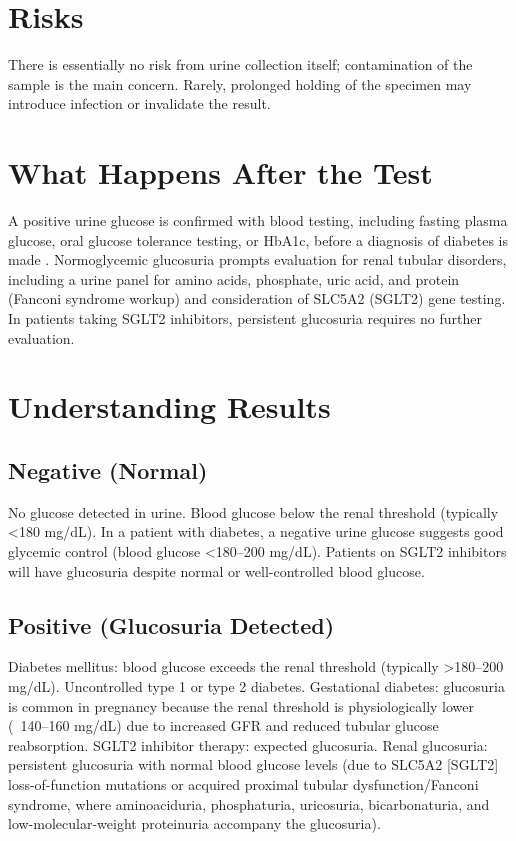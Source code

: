 \section*{Risks}
There is essentially no risk from urine collection itself; contamination of the sample is the main concern. Rarely, prolonged holding of the specimen may introduce infection or invalidate the result.
\section*{What Happens After the Test}
A positive urine glucose is confirmed with blood testing, including fasting plasma glucose, oral glucose tolerance testing, or HbA1c, before a diagnosis of diabetes is made \cite{ada2024standards}. Normoglycemic glucosuria prompts evaluation for renal tubular disorders, including a urine panel for amino acids, phosphate, uric acid, and protein (Fanconi syndrome workup) and consideration of SLC5A2 (SGLT2) gene testing. In patients taking SGLT2 inhibitors, persistent glucosuria requires no further evaluation.
\section*{Understanding Results}
\subsection*{Negative (Normal)}
No glucose detected in urine. Blood glucose below the renal threshold (typically <180 mg/dL). In a patient with diabetes, a negative urine glucose suggests good glycemic control (blood glucose <180--200 mg/dL). Patients on SGLT2 inhibitors will have glucosuria despite normal or well-controlled blood glucose.
\subsection*{Positive (Glucosuria Detected)}
Diabetes mellitus: blood glucose exceeds the renal threshold (typically >180--200 mg/dL). Uncontrolled type 1 or type 2 diabetes. Gestational diabetes: glucosuria is common in pregnancy because the renal threshold is physiologically lower (~140--160 mg/dL) due to increased GFR and reduced tubular glucose reabsorption. SGLT2 inhibitor therapy: expected glucosuria. Renal glucosuria: persistent glucosuria with normal blood glucose levels (due to SLC5A2 [SGLT2] loss-of-function mutations or acquired proximal tubular dysfunction/Fanconi syndrome, where aminoaciduria, phosphaturia, uricosuria, bicarbonaturia, and low-molecular-weight proteinuria accompany the glucosuria).
